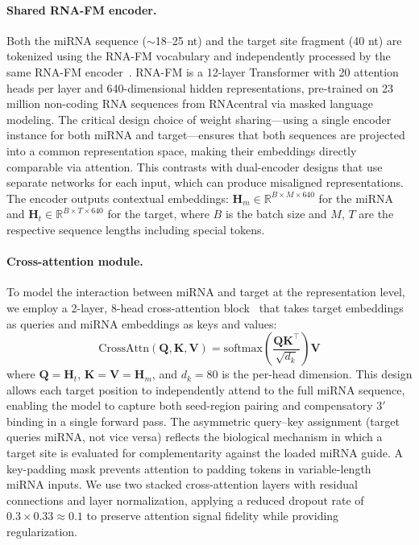 \documentclass[10pt,a4paper]{article}
\begin{document}
\paragraph{Shared RNA-FM encoder.} Both the miRNA sequence ($\sim$18--25 nt) and the target site fragment (40 nt) are tokenized using the RNA-FM vocabulary and independently processed by the same RNA-FM encoder~\citep{chen2022rnafm}. RNA-FM is a 12-layer Transformer with 20 attention heads per layer and 640-dimensional hidden representations, pre-trained on 23 million non-coding RNA sequences from RNAcentral via masked language modeling. The critical design choice of weight sharing---using a single encoder instance for both miRNA and target---ensures that both sequences are projected into a common representation space, making their embeddings directly comparable via attention. This contrasts with dual-encoder designs that use separate networks for each input, which can produce misaligned representations. The encoder outputs contextual embeddings: $\mathbf{H}_m \in \mathbb{R}^{B \times M \times 640}$ for the miRNA and $\mathbf{H}_t \in \mathbb{R}^{B \times T \times 640}$ for the target, where $B$ is the batch size and $M$, $T$ are the respective sequence lengths including special tokens.

\paragraph{Cross-attention module.} To model the interaction between miRNA and target at the representation level, we employ a 2-layer, 8-head cross-attention block~\citep{vaswani2017attention} that takes target embeddings as queries and miRNA embeddings as keys and values:
\begin{equation}
    \text{CrossAttn}(\mathbf{Q}, \mathbf{K}, \mathbf{V}) = \text{softmax}\!\left(\frac{\mathbf{Q}\mathbf{K}^\top}{\sqrt{d_k}}\right)\!\mathbf{V}
\end{equation}
where $\mathbf{Q} = \mathbf{H}_t$, $\mathbf{K} = \mathbf{V} = \mathbf{H}_m$, and $d_k = 80$ is the per-head dimension. This design allows each target position to independently attend to the full miRNA sequence, enabling the model to capture both seed-region pairing and compensatory 3$'$ binding in a single forward pass. The asymmetric query--key assignment (target queries miRNA, not vice versa) reflects the biological mechanism in which a target site is evaluated for complementarity against the loaded miRNA guide. A key-padding mask prevents attention to padding tokens in variable-length miRNA inputs. We use two stacked cross-attention layers with residual connections and layer normalization, applying a reduced dropout rate of $0.3 \times 0.33 \approx 0.1$ to preserve attention signal fidelity while providing regularization.
\end{document}

